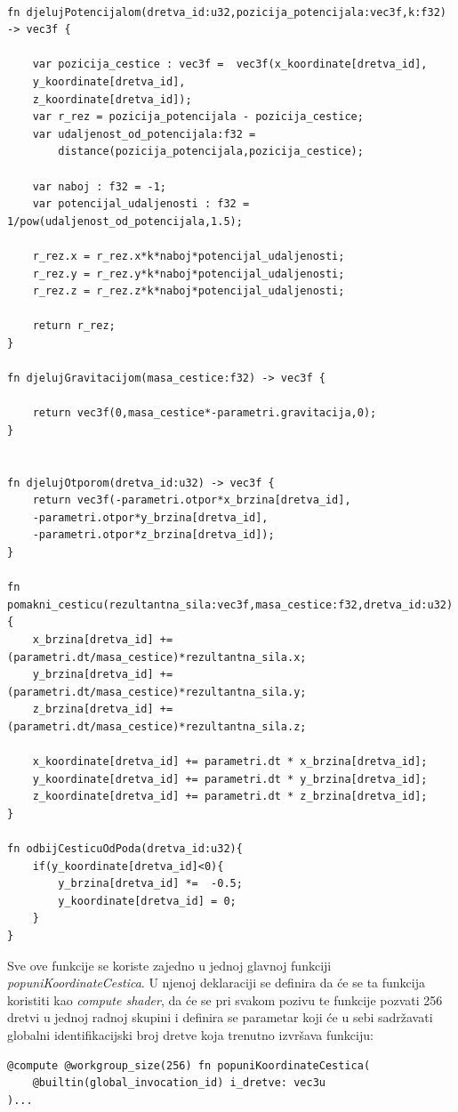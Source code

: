 \documentclass{foi}
\begin{document}
\begin{verbatim}

fn djelujPotencijalom(dretva_id:u32,pozicija_potencijala:vec3f,k:f32) -> vec3f {    
	
	var pozicija_cestice : vec3f =  vec3f(x_koordinate[dretva_id],
	y_koordinate[dretva_id],
	z_koordinate[dretva_id]);
	var r_rez = pozicija_potencijala - pozicija_cestice;
	var udaljenost_od_potencijala:f32 = 
		distance(pozicija_potencijala,pozicija_cestice);
	
	var naboj : f32 = -1;
	var potencijal_udaljenosti : f32 = 1/pow(udaljenost_od_potencijala,1.5);
	
	r_rez.x = r_rez.x*k*naboj*potencijal_udaljenosti;
	r_rez.y = r_rez.y*k*naboj*potencijal_udaljenosti;
	r_rez.z = r_rez.z*k*naboj*potencijal_udaljenosti;
	
	return r_rez;
}

fn djelujGravitacijom(masa_cestice:f32) -> vec3f {
	
	return vec3f(0,masa_cestice*-parametri.gravitacija,0);
}


fn djelujOtporom(dretva_id:u32) -> vec3f {
	return vec3f(-parametri.otpor*x_brzina[dretva_id],
	-parametri.otpor*y_brzina[dretva_id],
	-parametri.otpor*z_brzina[dretva_id]);
}

fn pomakni_cesticu(rezultantna_sila:vec3f,masa_cestice:f32,dretva_id:u32){
	x_brzina[dretva_id] +=  (parametri.dt/masa_cestice)*rezultantna_sila.x;
	y_brzina[dretva_id] +=  (parametri.dt/masa_cestice)*rezultantna_sila.y;
	z_brzina[dretva_id] +=  (parametri.dt/masa_cestice)*rezultantna_sila.z;
	
	x_koordinate[dretva_id] += parametri.dt * x_brzina[dretva_id];
	y_koordinate[dretva_id] += parametri.dt * y_brzina[dretva_id];
	z_koordinate[dretva_id] += parametri.dt * z_brzina[dretva_id];
}

fn odbijCesticuOdPoda(dretva_id:u32){
	if(y_koordinate[dretva_id]<0){
		y_brzina[dretva_id] *=  -0.5;
		y_koordinate[dretva_id] = 0;
	}
}
\end{verbatim}
	
Sve ove funkcije se koriste zajedno u jednoj glavnoj funkciji \textit{popuniKoordinateCestica}. U njenoj deklaraciji se definira da će se ta funkcija koristiti kao \textit{compute shader}, da će se pri svakom pozivu te funkcije pozvati 256 dretvi u jednoj radnoj skupini i definira se parametar koji će u sebi sadržavati globalni identifikacijski broj dretve koja trenutno izvršava funkciju:

\begin{verbatim}
@compute @workgroup_size(256) fn popuniKoordinateCestica(
	@builtin(global_invocation_id) i_dretve: vec3u
)...
\end{verbatim}
\end{document}
